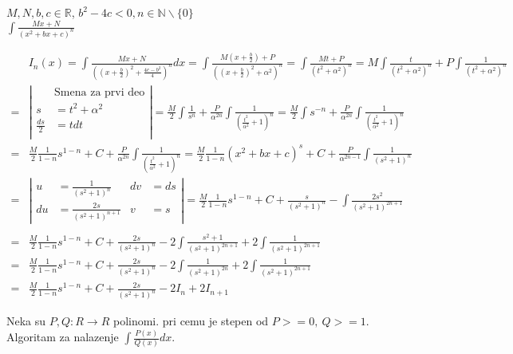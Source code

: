 \documentclass{article}
\begin{document}
\begin{primbox}
    $M, N, b, c \in \mathbb{R}$,
    $b^2 - 4c < 0, n \in \mathbb{N}\backslash\{0\}$\\
    $\int \frac{Mx + N}{(x^2 + bx + c)^n}$
\end{primbox}
\begin{align*}
      & I_n (x) = \int \frac{Mx + N}{((x+\frac{b}{2})^2 + \frac{4c-b^2}{4})^n}dx
    = \int \frac{M(x+\frac{b}{2}) + P}{((x+\frac{b}{2})^2 + \alpha^2)^n}
    = \int \frac{Mt + P}{(t^2 + \alpha ^2)^n}
    = M\int\frac{t}{(t^2+\alpha^2)^n} + P\int\frac{1}{(t^2 + \alpha^2)^n}                                                           \\
    = & \left | \begin{alignedat}{3}
                                 & \text{Smena za prvi deo} \\
                    s            & = t^2 + \alpha^2         \\
                    \frac{ds}{2} & = t dt                   \\
                \end{alignedat} \right |
    = \frac{M}{2} \int \frac{1}{s^n} + \frac{P}{\alpha^{2n}}\int\frac{1}{(\frac{t^2}{\alpha^2} + 1)^n}=
    \frac{M}{2}\int s^{-n} + \frac{P}{\alpha^{2n}}\int\frac{1}{(\frac{t^2}{\alpha^2} + 1)^n}                                        \\ = &
    \frac{M}{2} \frac{1}{1-n}s^{1-n} + C + \frac{P}{\alpha^{2n}}\int\frac{1}{(\frac{t^2}{\alpha^2} + 1)^n}
    = \frac{M}{2}\frac{1}{1-n}(x^2+bx + c)^s + C + \frac{P}{\alpha^{2n-1}}\int\frac{1}{(s^2 + 1)^n}                                 \\
    = & \left | \begin{alignedat}{2}
                    u  & = \frac{1}{(s^2+1)^n}      & dv & = ds \\
                    du & = \frac{2s}{(s^2+1)^{n+1}} & v  & = s
                \end{alignedat} \right |
    = \frac{M}{2} \frac{1}{1-n}s^{1-n} + C + \frac{s}{(s^2 + 1)^n} - \int\frac{2s^2}{(s^2+1)^{2n+1}}                                \\
    \\ = & \frac{M}{2} \frac{1}{1-n}s^{1-n} + C + \frac{2s}{(s^2 + 1)^n} - 2\int\frac{s^2 + 1}{(s^2+1)^{2n+1}} + 2\int\frac{1}{(s^2+1)^{2n+1}}\\
    = & \frac{M}{2} \frac{1}{1-n}s^{1-n} + C + \frac{2s}{(s^2 + 1)^n} - 2\int\frac{1}{(s^2+1)^{2n}} + 2\int\frac{1}{(s^2+1)^{2n+1}} \\
    = & \frac{M}{2} \frac{1}{1-n}s^{1-n} + C + \frac{2s}{(s^2 + 1)^n} - 2I_n + 2I_{n+1}
\end{align*}
\begin{primbox}
    Neka su $P, Q: R \longrightarrow R$ polinomi. pri cemu je stepen od $P >= 0,\ Q >= 1$.
    Algoritam za nalazenje $\int \frac{P(x)}{Q(x)}dx$.
\end{primbox}
\end{document}
